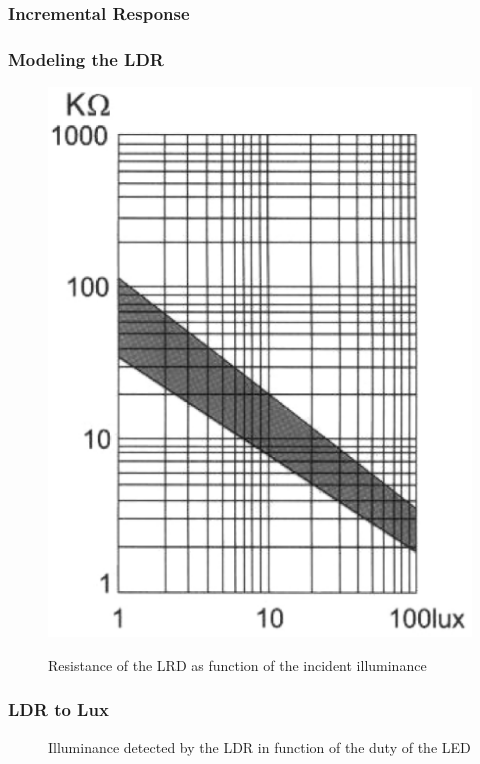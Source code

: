 \subsubsection{Incremental Response}
\label{sub:IncrementalResponse}

\subsubsection{Modeling the LDR}
\label{subsubsec:LDR_model}

\begin{figure}[h]
    \centering
    \includegraphics[width=.4\textwidth]{img/LDR_datasheet}
    \caption{}
    \label{fig:LDR_datasheet}
\end{figure}

\begin{figure}[h]
    \centering
    \resizebox{\textwidth}{!}{}
    \caption{Resistance of the LRD as function of the incident illuminance}
    \label{fig:LDR_model}
\end{figure}

\subsubsection{LDR to Lux}
\label{sub:LDRtoLux}

\begin{figure}[h]
    \centering
    \resizebox{\textwidth}{!}{}
    \caption{Illuminance detected by the LDR in function of the duty of the LED}
    \label{fig:pwm_to_lux}
\end{figure}


